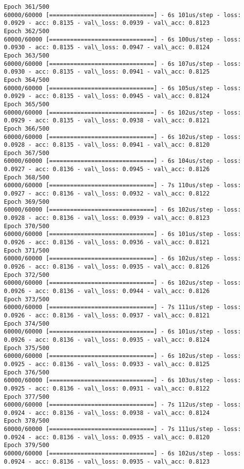 \documentclass[11pt]{article}
\begin{document}
\begin{Verbatim}[commandchars=\\\{\}]
Epoch 361/500
60000/60000 [==============================] - 6s 101us/step - loss: 0.0929 - acc: 0.8135 - val\_loss: 0.0939 - val\_acc: 0.8123
Epoch 362/500
60000/60000 [==============================] - 6s 100us/step - loss: 0.0930 - acc: 0.8135 - val\_loss: 0.0947 - val\_acc: 0.8124
Epoch 363/500
60000/60000 [==============================] - 6s 107us/step - loss: 0.0930 - acc: 0.8135 - val\_loss: 0.0941 - val\_acc: 0.8125
Epoch 364/500
60000/60000 [==============================] - 6s 105us/step - loss: 0.0929 - acc: 0.8135 - val\_loss: 0.0945 - val\_acc: 0.8124
Epoch 365/500
60000/60000 [==============================] - 6s 102us/step - loss: 0.0929 - acc: 0.8135 - val\_loss: 0.0938 - val\_acc: 0.8121
Epoch 366/500
60000/60000 [==============================] - 6s 102us/step - loss: 0.0928 - acc: 0.8135 - val\_loss: 0.0941 - val\_acc: 0.8120
Epoch 367/500
60000/60000 [==============================] - 6s 104us/step - loss: 0.0927 - acc: 0.8136 - val\_loss: 0.0945 - val\_acc: 0.8126
Epoch 368/500
60000/60000 [==============================] - 7s 110us/step - loss: 0.0927 - acc: 0.8136 - val\_loss: 0.0932 - val\_acc: 0.8122
Epoch 369/500
60000/60000 [==============================] - 6s 102us/step - loss: 0.0928 - acc: 0.8136 - val\_loss: 0.0939 - val\_acc: 0.8123
Epoch 370/500
60000/60000 [==============================] - 6s 101us/step - loss: 0.0926 - acc: 0.8136 - val\_loss: 0.0936 - val\_acc: 0.8121
Epoch 371/500
60000/60000 [==============================] - 6s 102us/step - loss: 0.0926 - acc: 0.8136 - val\_loss: 0.0935 - val\_acc: 0.8126
Epoch 372/500
60000/60000 [==============================] - 6s 102us/step - loss: 0.0926 - acc: 0.8136 - val\_loss: 0.0944 - val\_acc: 0.8126
Epoch 373/500
60000/60000 [==============================] - 7s 111us/step - loss: 0.0926 - acc: 0.8136 - val\_loss: 0.0937 - val\_acc: 0.8121
Epoch 374/500
60000/60000 [==============================] - 6s 101us/step - loss: 0.0926 - acc: 0.8136 - val\_loss: 0.0935 - val\_acc: 0.8124
Epoch 375/500
60000/60000 [==============================] - 6s 102us/step - loss: 0.0925 - acc: 0.8136 - val\_loss: 0.0933 - val\_acc: 0.8125
Epoch 376/500
60000/60000 [==============================] - 6s 103us/step - loss: 0.0925 - acc: 0.8136 - val\_loss: 0.0931 - val\_acc: 0.8122
Epoch 377/500
60000/60000 [==============================] - 7s 112us/step - loss: 0.0924 - acc: 0.8136 - val\_loss: 0.0938 - val\_acc: 0.8124
Epoch 378/500
60000/60000 [==============================] - 7s 111us/step - loss: 0.0924 - acc: 0.8136 - val\_loss: 0.0935 - val\_acc: 0.8120
Epoch 379/500
60000/60000 [==============================] - 6s 102us/step - loss: 0.0924 - acc: 0.8136 - val\_loss: 0.0935 - val\_acc: 0.8123

\end{Verbatim}
\end{document}
